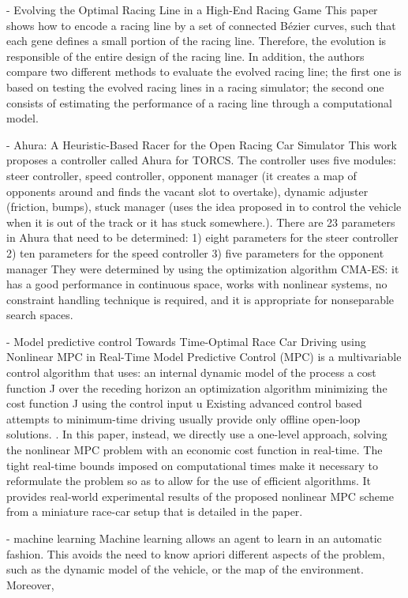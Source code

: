 - Evolving the Optimal Racing Line in a High-End Racing Game
This paper shows how to encode a racing line by a set of connected Bézier curves, such that each gene defines a small portion of the racing line. Therefore, the evolution is responsible of the entire design of the racing line. In addition, the authors compare two different methods to evaluate the evolved racing line; the first one is based on testing the evolved racing lines in a racing simulator; the second one consists of estimating the performance of a racing line through a computational model.
	
- Ahura: A Heuristic-Based Racer for the Open Racing Car Simulator
This work proposes a controller called Ahura for TORCS. The controller uses five modules: steer controller, speed controller, opponent manager (it creates a map of opponents around  and finds the vacant slot to overtake), dynamic adjuster (friction, bumps), stuck manager (uses the idea proposed in to control the vehicle when it is out of the track or it has stuck somewhere.).
There are 23 parameters in Ahura that need to be determined:
1) eight parameters for the steer controller 
2) ten parameters for the speed controller 
3) five parameters for the opponent manager
They were determined by using the optimization algorithm CMA-ES: it has a good performance in continuous space, works with nonlinear systems, no constraint handling technique is required, and it is appropriate for nonseparable search spaces.


- Model predictive control Towards Time-Optimal Race Car Driving using Nonlinear MPC in
Real-Time
Model Predictive Control (MPC) is a multivariable control algorithm that uses:
an internal dynamic model of the process
a cost function J over the receding horizon
an optimization algorithm minimizing the cost function J using the control input u
Existing advanced control based attempts to minimum-time driving usually provide only offline open-loop solutions. . In this paper, instead, we directly use a one-level approach, solving the nonlinear MPC problem with an economic cost function in real-time. The tight real-time bounds imposed on computational times make it necessary to
reformulate the problem so as to allow for the use of efficient algorithms.
It provides real-world experimental results of the proposed nonlinear MPC scheme from a miniature race-car setup that is detailed in the paper. 

- machine learning
Machine learning allows an agent to learn in an automatic fashion. This avoids the need to know apriori different aspects of the problem, such as the dynamic model of the vehicle, or the map of the environment. Moreover, 

